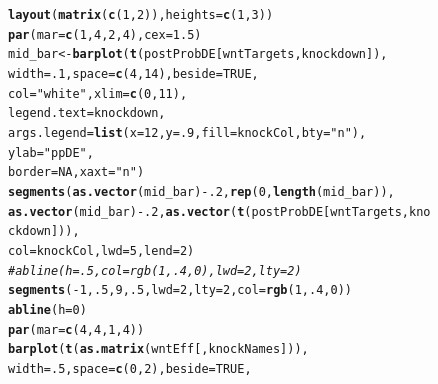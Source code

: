 \documentclass[a4paper]{article}\usepackage[]{graphicx}\usepackage[]{color}
\makeatletter
\newcommand{\hlnum}[1]{\textcolor[rgb]{0.686,0.059,0.569}{#1}}%
\newcommand{\hlstr}[1]{\textcolor[rgb]{0.192,0.494,0.8}{#1}}%
\newcommand{\hlcom}[1]{\textcolor[rgb]{0.678,0.584,0.686}{\textit{#1}}}%
\newcommand{\hlopt}[1]{\textcolor[rgb]{0,0,0}{#1}}%
\newcommand{\hlstd}[1]{\textcolor[rgb]{0.345,0.345,0.345}{#1}}%
\newcommand{\hlkwb}[1]{\textcolor[rgb]{0.69,0.353,0.396}{#1}}%
\newcommand{\hlkwc}[1]{\textcolor[rgb]{0.333,0.667,0.333}{#1}}%
\newcommand{\hlkwd}[1]{\textcolor[rgb]{0.737,0.353,0.396}{\textbf{#1}}}%
\newenvironment{kframe}{%
 \def\at@end@of@kframe{}%
 \ifinner\ifhmode%
  \def\at@end@of@kframe{\end{minipage}}%
  \begin{minipage}{\columnwidth}%
 \fi\fi%
 \def\FrameCommand##1{\hskip\@totalleftmargin \hskip-\fboxsep
 \colorbox{shadecolor}{##1}\hskip-\fboxsep
     \hskip-\linewidth \hskip-\@totalleftmargin \hskip\columnwidth}%
 \MakeFramed {\advance\hsize-\width
   \@totalleftmargin\z@ \linewidth\hsize
   \@setminipage}}%
 {\par\unskip\endMakeFramed%
 \at@end@of@kframe}
\newenvironment{knitrout}{}{} %
\makeatother
\begin{document}
\begin{figure}[htbp]
\begin{center}
\begin{knitrout}
\color{fgcolor}\begin{kframe}
\begin{alltt}
\hlkwd{layout}\hlstd{(}\hlkwd{matrix}\hlstd{(}\hlkwd{c}\hlstd{(}\hlnum{1}\hlstd{,}\hlnum{2}\hlstd{)),} \hlkwc{heights}\hlstd{=}\hlkwd{c}\hlstd{(}\hlnum{1}\hlstd{,}\hlnum{3}\hlstd{))}
\hlkwd{par}\hlstd{(}\hlkwc{mar} \hlstd{=} \hlkwd{c}\hlstd{(}\hlnum{1}\hlstd{,}\hlnum{4}\hlstd{,}\hlnum{2}\hlstd{,}\hlnum{4}\hlstd{),} \hlkwc{cex}\hlstd{=}\hlnum{1.5}\hlstd{)}
\hlstd{mid_bar} \hlkwb{<-} \hlkwd{barplot}\hlstd{(}\hlkwd{t}\hlstd{(postProbDE[wntTargets, knockdown]),}
        \hlkwc{width}\hlstd{=}\hlnum{.1}\hlstd{,} \hlkwc{space}\hlstd{=}\hlkwd{c}\hlstd{(}\hlnum{4}\hlstd{,}\hlnum{14}\hlstd{),} \hlkwc{beside}\hlstd{=}\hlnum{TRUE}\hlstd{,}
        \hlkwc{col}\hlstd{=}\hlstr{"white"}\hlstd{,} \hlkwc{xlim}\hlstd{=}\hlkwd{c}\hlstd{(}\hlnum{0}\hlstd{,}\hlnum{11}\hlstd{),}
        \hlkwc{legend.text}\hlstd{=knockdown,}
        \hlkwc{args.legend}\hlstd{=}\hlkwd{list}\hlstd{(}\hlkwc{x}\hlstd{=}\hlnum{12}\hlstd{,} \hlkwc{y}\hlstd{=}\hlnum{.9}\hlstd{,} \hlkwc{fill}\hlstd{=knockCol,} \hlkwc{bty}\hlstd{=}\hlstr{"n"}\hlstd{),}
        \hlkwc{ylab}\hlstd{=}\hlstr{"pp DE"}\hlstd{,}
        \hlkwc{border}\hlstd{=}\hlnum{NA}\hlstd{,} \hlkwc{xaxt}\hlstd{=}\hlstr{"n"}\hlstd{)}
\hlkwd{segments}\hlstd{(}\hlkwd{as.vector}\hlstd{(mid_bar)}\hlopt{-}\hlnum{.2}\hlstd{,} \hlkwd{rep}\hlstd{(}\hlnum{0}\hlstd{,} \hlkwd{length}\hlstd{(mid_bar)),}
         \hlkwd{as.vector}\hlstd{(mid_bar)}\hlopt{-}\hlnum{.2}\hlstd{,} \hlkwd{as.vector}\hlstd{(}\hlkwd{t}\hlstd{(postProbDE[wntTargets, knockdown])),}
         \hlkwc{col}\hlstd{=knockCol,} \hlkwc{lwd}\hlstd{=}\hlnum{5}\hlstd{,} \hlkwc{lend}\hlstd{=}\hlnum{2}\hlstd{)}
\hlcom{# abline(h=.5, col=rgb(1, .4, 0), lwd=2, lty=2)}
\hlkwd{segments}\hlstd{(}\hlopt{-}\hlnum{1}\hlstd{,} \hlnum{.5}\hlstd{,} \hlnum{9}\hlstd{,} \hlnum{.5}\hlstd{,} \hlkwc{lwd}\hlstd{=}\hlnum{2}\hlstd{,} \hlkwc{lty}\hlstd{=}\hlnum{2}\hlstd{,} \hlkwc{col}\hlstd{=}\hlkwd{rgb}\hlstd{(}\hlnum{1}\hlstd{,} \hlnum{.4}\hlstd{,} \hlnum{0}\hlstd{))}
\hlkwd{abline}\hlstd{(}\hlkwc{h}\hlstd{=}\hlnum{0}\hlstd{)}
\hlkwd{par}\hlstd{(}\hlkwc{mar} \hlstd{=} \hlkwd{c}\hlstd{(}\hlnum{4}\hlstd{,}\hlnum{4}\hlstd{,}\hlnum{1}\hlstd{,}\hlnum{4}\hlstd{))}
\hlkwd{barplot}\hlstd{(}\hlkwd{t}\hlstd{(}\hlkwd{as.matrix}\hlstd{(wntEff[,knockNames])),}
        \hlkwc{width}\hlstd{=}\hlnum{.5}\hlstd{,} \hlkwc{space}\hlstd{=}\hlkwd{c}\hlstd{(}\hlnum{0}\hlstd{,}\hlnum{2}\hlstd{),} \hlkwc{beside}\hlstd{=}\hlnum{TRUE}\hlstd{,}

\end{alltt}
\end{kframe}
\end{knitrout}
\end{center}
\end{figure}
\end{document}
